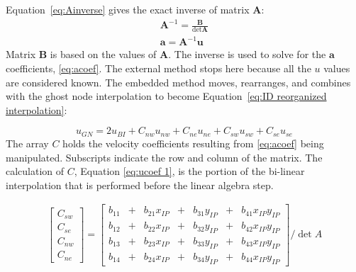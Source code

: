 Equation~\eqref{eq:Ainverse} gives the exact inverse of matrix $\textbf{A}$:
\begin{align}
\textbf{A}^{-1} = \frac{\textbf{B}}{\det{\textbf{A}}}
\label{eq:Ainverse}\\
\textbf{a}=\textbf{A}^{-1}\textbf{u}\;\label{eq:acoef}
\end{align}
Matrix $\textbf{B}$ is based on the values of $\textbf{A}$. 
The inverse is used to solve for the $\textbf{a}$ coefficients, \eqref{eq:acoef}.
The external method stops here because all the $u$ values are considered known. 
The embedded method moves, rearranges, and combines with the ghost node interpolation to become Equation~\eqref{eq:ID reorganized interpolation}:

\begin{equation}
u_{GN} = 2u_{BI} + C_{nw}u_{nw} + C_{ne}u_{ne} + C_{sw}u_{sw} + C_{se}u_{se}\label{eq:ID reorganized interpolation}
\end{equation}
The array $C$ holds the velocity coefficients resulting from \eqref{eq:acoef} being manipulated. 
Subscripts indicate the row and column of the matrix. 
The calculation of $C$, Equation \eqref{eq:ucoef 1}, is the portion of the bi-linear interpolation that is performed before the linear algebra step. 

\begin{gather}
	\begin{bmatrix}
		C_{sw}\\
		C_{se}\\
		C_{nw}\\
		C_{ne}
	\end{bmatrix}
=
	\begin{bmatrix}
		b_{11}&+&b_{21}x_{IP}&+&b_{31}y_{IP}&+&b_{41}x_{IP}y_{IP}\\
		b_{12}&+&b_{22}x_{IP}&+&b_{32}y_{IP}&+&b_{42}x_{IP}y_{IP}\\
		b_{13}&+&b_{23}x_{IP}&+&b_{33}y_{IP}&+&b_{43}x_{IP}y_{IP}\\
		b_{14}&+&b_{24}x_{IP}&+&b_{34}y_{IP}&+&b_{44}x_{IP}y_{IP}
	\end{bmatrix}
	/\det{A}
\label{eq:ucoef 1}
\end{gather}

